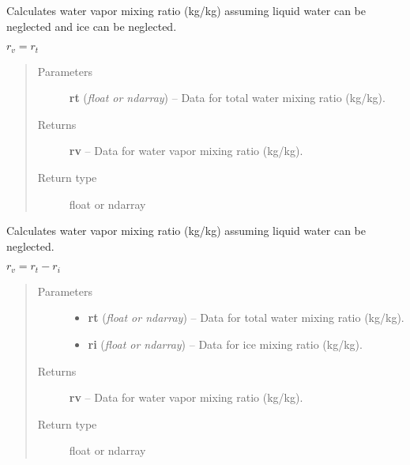 \documentclass[letterpaper,10pt,english]{sphinxmanual}
\begin{document}

\begin{fulllineitems}
\label{atmos:atmos.equations.rv_from_rt}
Calculates water vapor mixing ratio (kg/kg) assuming liquid water can be
neglected and ice can be neglected.

\(r_v = r_t\)
\begin{quote}\begin{description}
\item[{Parameters}] \leavevmode
\textbf{rt} (\emph{float or ndarray}) -- Data for total water mixing ratio (kg/kg).

\item[{Returns}] \leavevmode
\textbf{rv} --
Data for water vapor mixing ratio (kg/kg).

\item[{Return type}] \leavevmode
float or ndarray

\end{description}\end{quote}

\end{fulllineitems}


\begin{fulllineitems}
\label{atmos:atmos.equations.rv_from_rt_ri}
Calculates water vapor mixing ratio (kg/kg) assuming liquid water can be
neglected.

\(r_v = r_t - r_i\)
\begin{quote}\begin{description}
\item[{Parameters}] \leavevmode\begin{itemize}
\item {} 
\textbf{rt} (\emph{float or ndarray}) -- Data for total water mixing ratio (kg/kg).

\item {} 
\textbf{ri} (\emph{float or ndarray}) -- Data for ice mixing ratio (kg/kg).

\end{itemize}

\item[{Returns}] \leavevmode
\textbf{rv} --
Data for water vapor mixing ratio (kg/kg).

\item[{Return type}] \leavevmode
float or ndarray

\end{description}\end{quote}

\end{fulllineitems}
\end{document}
